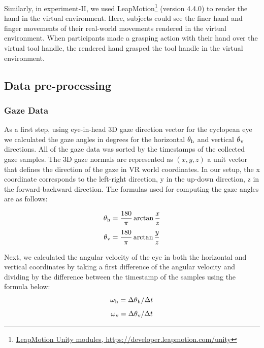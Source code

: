 Similarly, in experiment-II, we used LeapMotion\footnote{\href{https://developer.leapmotion.com/unity}{LeapMotion Unity modules, https://developer.leapmotion.com/unity}} (version 4.4.0)  to render the hand in the virtual environment. Here, subjects could see the finer hand and finger movements of their real-world movements rendered in the virtual environment. When participants made a grasping action with their hand over the virtual tool handle, the rendered hand grasped the tool handle in the virtual environment.

\subsection{Data pre-processing}

\subsubsection{Gaze Data}

As a first step, using eye-in-head 3D gaze direction vector for the cyclopean eye we calculated the gaze angles in degrees for the horizontal $\theta\textsubscript{h}$ and vertical $\theta\textsubscript{v}$ directions. All of the gaze data was sorted by the timestamps of the collected gaze samples. The 3D gaze normals are represented as $(x, y, z)$ a unit vector that defines the direction of the gaze in VR world coordinates. In our setup, the x coordinate corresponds to the left-right direction, y in the up-down direction, z in the forward-backward direction. The formulas used for computing the gaze angles are as follows:

 \begin{equation*}\label{eq:h_angle}
     \theta\textsubscript{h} = \frac{180}{\pi} \arctan{\frac{x}{z}}
 \end{equation*}   
  \begin{equation*}\label{eq:v_angle}
     \theta\textsubscript{v} = \frac{180}{\pi} \arctan{\frac{y}{z}} 
 \end{equation*}   
 
Next, we calculated the angular velocity of the eye in both the horizontal and vertical coordinates by taking a first difference of the angular velocity and dividing by the difference between the timestamp of the samples using the formula below:
\begin{equation*}\label{eq:h_vel_angle}
    \omega\textsubscript{h} = \Delta\theta\textsubscript{h} / \Delta t
 \end{equation*}  
 \begin{equation*}\label{eq:v_vel_angle}
     \omega\textsubscript{v} = \Delta\theta\textsubscript{v} / \Delta t
 \end{equation*}  

